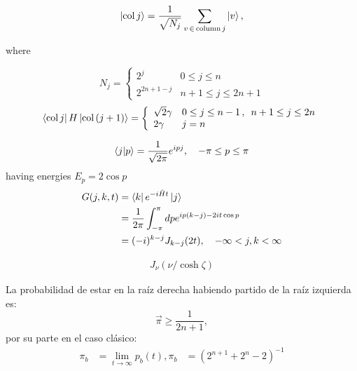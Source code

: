 \begin{equation*}
    \ket{\text{col}\,j}=\dfrac{1}{\sqrt{N_j}}\sum_{v\,\in \, \text{column}\,j} \ket{v},
\end{equation*}{}

where

\begin{equation*}
    N_j=
    \left\{
    \begin{array}{ll}
    2^j & 0\leq j\leq n\\
    2^{2n+1-j} & n+1\leq j \leq 2n+1
    \end{array}
    \right.
\end{equation*}{}
\begin{equation*}
    \bra{\text{col}\,j}H\ket{\text{col}\,(j+1)}=
    \left\{
    \begin{array}{ll}
    \sqrt{2}\gamma     & 0\leq j\leq n-1\,,\,\,\,n+1\leq j\leq 2n  \\
    2\gamma     & j=n 
    \end{array}{}
    \right.
\end{equation*}{}

\begin{equation*}
    \braket{j|p}=\dfrac{1}{\sqrt{2\pi}}e^{ipj},\,\,\,\,\,\,-\pi\leq p\leq\pi
\end{equation*}{}
having energies $E_p=2\cos p$
\begin{align*}
    G(j,k,t)&=\bra{k}e^{-i\hat{H}t}\ket{j}\\
    &=\dfrac{1}{2\pi}\int_{-\pi}^{\pi}dp e^{ip(k-j)-2it\cos p}\\
    &=(-i)^{k-j}J_{k-j}(2t), \,\,\,\,\,\, -\infty < j,k < \infty
\end{align*}{}

\begin{align}
    J_\nu(\nu/\cosh{\zeta})
\end{align}{}

La probabilidad de estar en la raíz derecha habiendo partido de la raíz izquierda es:
\begin{equation}
    \Vec{\pi}\geq \frac{1}{2n+1},
\end{equation}
por su parte en el caso clásico:
\begin{align}
    \pi_b&=\lim_{t\xrightarrow{}\infty} p_b(t),
    \pi_b&=(2^{n+1}+2^n-2)^{-1}\\
\end{align}
\cite{childs2002example}


